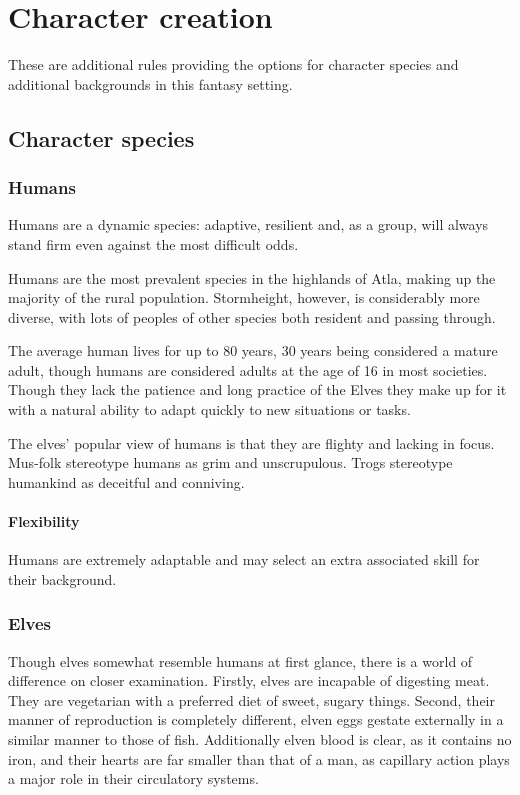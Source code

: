 \documentclass[a4paper,11pt,oneside]{book}
\begin{document}
\chapter{Character creation}
These are additional rules providing the options for character species and additional backgrounds in this fantasy setting.

\section{Character species}

\subsection{Humans}
Humans are a dynamic species: adaptive, resilient and, as a group, will always stand firm even against the most difficult odds.

Humans are the most prevalent species in the highlands of Atla, making up the majority of the rural population. Stormheight, however, is considerably more diverse, with lots of peoples of other species both resident and passing through.

The average human lives for up to 80 years, 30 years being considered a mature adult, though humans are considered adults at the age of 16 in most societies. Though they lack the patience and long practice of the Elves they make up for it with a natural ability to adapt quickly to new situations or tasks. 

The elves' popular view of humans is that they are flighty and lacking in focus. Mus-folk stereotype humans as grim and unscrupulous. Trogs stereotype humankind as deceitful and conniving.  

\subsubsection*{Flexibility}
Humans are extremely adaptable and may select an extra associated skill for their background.


\subsection{Elves}
Though elves somewhat resemble humans at first glance, there is a world of difference on closer examination. Firstly, elves are incapable of digesting meat. They are vegetarian with a preferred diet of sweet, sugary things. Second, their manner of reproduction is completely different, elven eggs gestate externally in a similar manner to those of fish. Additionally elven blood is clear, as it contains no iron, and their hearts are far smaller than that of a man, as capillary action plays a major role in their circulatory systems.
\end{document}
